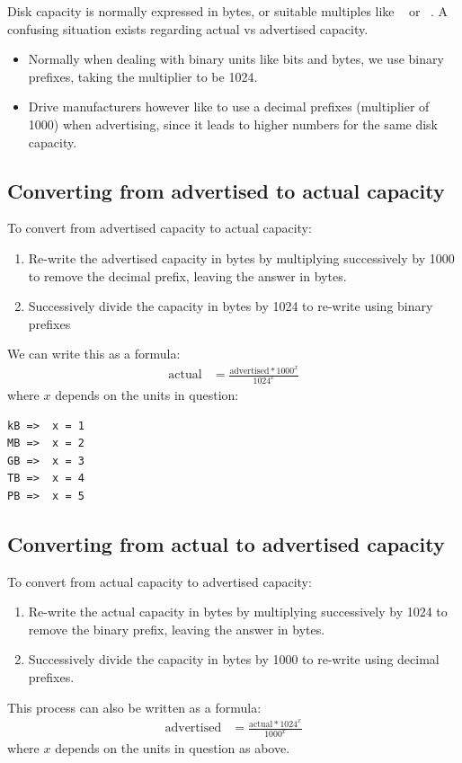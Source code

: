 Disk capacity is normally expressed in bytes, or suitable multiples like \si{\giga\byte}
or \si{\tera\byte}. A confusing situation exists regarding actual vs advertised
capacity.

\begin{itemize}
\item
  Normally when dealing with binary units like bits and bytes, we use
  binary prefixes, taking the multiplier to be 1024.
\item
  Drive manufacturers however like to use a decimal prefixes (multiplier
  of 1000) when advertising, since it leads to higher numbers for the
  same disk capacity.
\end{itemize}

\subsection{Converting from advertised to actual capacity}
\label{sec:converting-from-advertised-to-actual-capacity}

To convert from advertised capacity to actual capacity:

\begin{enumerate}
\item
  Re-write the advertised capacity in bytes by multiplying successively
  by 1000 to remove the decimal prefix, leaving the answer in bytes.
\item
  Successively divide the capacity in bytes by 1024 to re-write using
  binary prefixes
\end{enumerate}

We can write this as a formula:
\begin{align}
  \mbox{actual} & = \frac{ \mbox{advertised} * 1000^x }{ 1024^x } \label{eq:advertised-to-actual-capacity}
\end{align}
where $x$ depends on the units in question:
\begin{verbatim}
kB =>  x = 1
MB =>  x = 2
GB =>  x = 3
TB =>  x = 4
PB =>  x = 5
\end{verbatim}

\subsection{Converting from actual to advertised capacity}
\label{sec:converting-from-actual-to-advertised-capacity}

To convert from actual capacity to advertised capacity:
\begin{enumerate}
\item
  Re-write the actual capacity in bytes by multiplying successively by
  1024 to remove the binary prefix, leaving the answer in bytes.
\item
  Successively divide the capacity in bytes by 1000 to re-write using
  decimal prefixes.
\end{enumerate}

This process can also be written as a formula:
\begin{align}
  \mbox{advertised} & = \frac{\mbox{actual} * 1024^x}{1000^x} 
\end{align}
where $x$ depends on the units in question as above.
